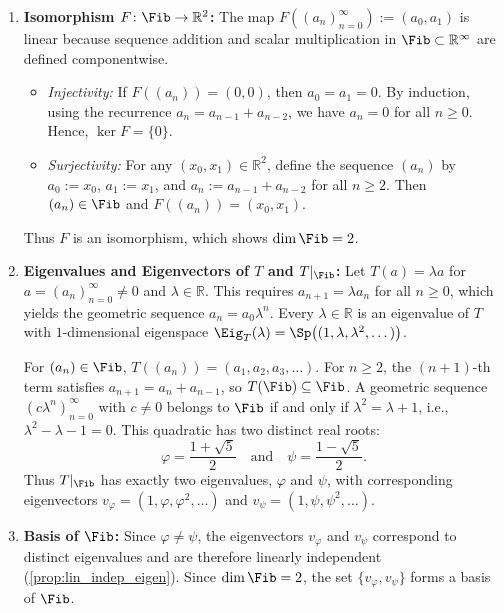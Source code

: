 \begin{exercisesolution}
\label{sol:fibonacci_sequence_space_shift_eigenvalues}
\begin{enumerate}[label=\textbf{(\alph*)}]
    \item \textbf{Isomorphism $F \colon \Fib \to \mathbb{R}^2$:}
    The map $F((a_n)_{n=0}^\infty) := (a_0, a_1)$ is linear because sequence addition and scalar multiplication in $\Fib \subset \mathbb{R}^\infty$ are defined componentwise.
    \begin{itemize}
        \item \emph{Injectivity:} If $F((a_n)) = (0, 0)$, then $a_0 = a_1 = 0$. By induction, using the recurrence $a_n = a_{n-1} + a_{n-2}$, we have $a_n = 0$ for all $n \ge 0$. Hence, $\ker F = \{0\}$.
        \item \emph{Surjectivity:} For any $(x_0, x_1) \in \mathbb{R}^2$, define the sequence $(a_n)$ by $a_0 := x_0$, $a_1 := x_1$, and $a_n := a_{n-1} + a_{n-2}$ for all $n \ge 2$. Then $(a_n) \in \Fib$ and $F((a_n)) = (x_0, x_1)$.
    \end{itemize}
    Thus $F$ is an isomorphism, which shows $\dim \Fib = 2$.

    \item \textbf{Eigenvalues and Eigenvectors of $T$ and $T|_{\Fib}$:}
    Let $T(a) = \lambda a$ for $a = (a_n)_{n=0}^\infty \ne 0$ and $\lambda \in \mathbb{R}$. This requires $a_{n+1} = \lambda a_n$ for all $n \ge 0$, which yields the geometric sequence $a_n = a_0 \lambda^n$.
    Every $\lambda \in \mathbb{R}$ is an eigenvalue of $T$ with $1$-dimensional eigenspace $\Eig_T(\lambda) = \Sp\big((1, \lambda, \lambda^2, \dots)\big)$.

    For $(a_n) \in \Fib$, $T((a_n)) = (a_1, a_2, a_3, \dots)$. For $n \ge 2$, the $(n+1)$-th term satisfies $a_{n+1} = a_n + a_{n-1}$, so $T(\Fib) \subseteq \Fib$.
    A geometric sequence $(c \lambda^n)_{n=0}^\infty$ with $c \ne 0$ belongs to $\Fib$ if and only if $\lambda^2 = \lambda + 1$, i.e., $\lambda^2 - \lambda - 1 = 0$.
    This quadratic has two distinct real roots:
    \[
    \varphi = \frac{1+\sqrt{5}}{2} \quad \text{and} \quad \psi = \frac{1-\sqrt{5}}{2}.
    \]
    Thus $T|_{\Fib}$ has exactly two eigenvalues, $\varphi$ and $\psi$, with corresponding eigenvectors $v_\varphi = (1, \varphi, \varphi^2, \dots)$ and $v_\psi = (1, \psi, \psi^2, \dots)$.

    \item \textbf{Basis of $\Fib$:}
    Since $\varphi \ne \psi$, the eigenvectors $v_\varphi$ and $v_\psi$ correspond to distinct eigenvalues and are therefore linearly independent (\cref{prop:lin_indep_eigen}).
    Since $\dim \Fib = 2$, the set $\{v_\varphi, v_\psi\}$ forms a basis of $\Fib$. \qedhere
\end{enumerate}
\end{exercisesolution}

